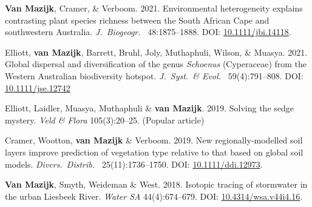 \begin{hangparas}{2em}{1}

\textbf{Van Mazijk}, Cramer, \& Verboom. 2021.
Environmental heterogeneity explains contrasting plant species richness between
the South African Cape and southwestern Australia. \textit{J.~Biogeogr.~}
48:1875--1888. DOI: \href{https://doi.org/10.1111/jbi.14118}{10.1111/jbi.14118}.

Elliott, \textbf{van Mazijk}, Barrett, Bruhl, Joly,
Muthaphuli, Wilson, \& Muasya. 2021. Global dispersal and
diversification of the genus \textit{Schoenus} (Cyperaceae) from the Western
Australian biodiversity hotspot. \textit{J.~Syst.~\& Evol.~} 59(4):791--808. DOI:
\href{https://doi.org/10.1111/jse.1274}{10.1111/jse.12742}

Elliott, Laidler, Muasya, Muthaphuli \& \textbf{van Mazijk}. 2019. Solving the
sedge mystery. \textit{Veld \& Flora} 105(3):20--25. (Popular article)

Cramer, Wootton, \textbf{van Mazijk} \& Verboom. 2019.
New regionally-modelled soil layers improve prediction of vegetation type
relative to that based on global soil models. \textit{Divers.~Distrib.~}
25(11):1736--1750. DOI:
\href{https://doi.org/10.1111/ddi.12973}{10.1111/ddi.12973}.

\textbf{Van Mazijk}, Smyth, Weideman \& West. 2018.
Isotopic tracing of stormwater in the urban Liesbeek River. \textit{Water SA}
44(4):674--679. DOI:
\href{https://doi.org/10.4314/wsa.v44i4.16}{10.4314/wsa.v44i4.16}.

\end{hangparas}
